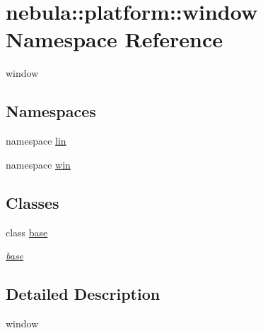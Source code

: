 \hypertarget{namespacenebula_1_1platform_1_1window}{
\section{nebula::platform::window Namespace Reference}
\label{namespacenebula_1_1platform_1_1window}
}


window  
\subsection*{Namespaces}
\begin{DoxyCompactItemize}
\item 
namespace \hyperlink{namespacenebula_1_1platform_1_1window_1_1lin}{lin}
\item 
namespace \hyperlink{namespacenebula_1_1platform_1_1window_1_1win}{win}
\end{DoxyCompactItemize}
\subsection*{Classes}
\begin{DoxyCompactItemize}
\item 
class \hyperlink{classnebula_1_1platform_1_1window_1_1base}{base}
\begin{DoxyCompactList}\small\item\em \hyperlink{classnebula_1_1platform_1_1window_1_1base}{base} \item\end{DoxyCompactList}\end{DoxyCompactItemize}


\subsection{Detailed Description}
window 